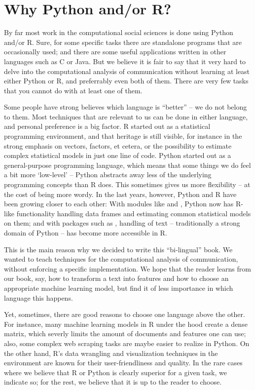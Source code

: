 \section{Why Python and/or R?}
By far most work in the computational social sciences is done using
Python and/or R. Sure, for some specific tasks there are standalone
programs that are occasionally used; and there are some useful applications
written in other languages such as C or Java. But we believe it is
fair to say that it very hard to delve into the computational analysis
of communication without learning at least either Python or R, and
preferrably even both of them.
There are very few tasks that you cannot do with at least one of them.

Some people have strong believes which language is ``better'' -- we do
not belong to them. Most techniques that are relevant to us can be
done in either language, and personal preference is a big factor. R
started out as a statistical programming environment, and that
heritage is still visible, for instance in the strong emphasis on
vectors, factors, et cetera, or the possibility to estimate complex
statistical models in just one line of code. Python started out as a
general-purpose programming language, which means that some things we
do feel a bit more `low-level' -- Python abstracts away less of the
underlying programming concepts than R does. This sometimes gives us
more flexibility -- at the cost of being more wordy.
In the last years, however, Python and R have been
growing closer to each other: With modules like  and
, Python now has R-like functionality handling data
frames and estimating common statistical models on them; and with
packages such as , handling of text -- traditionally a
strong domain of Python -- has become more accessible in R.

This is the main reason why we decided to write this ``bi-lingual''
book. We wanted to teach techniques for the computational analysis of
communication, without enforcing a specific implementation. We hope
that the reader learns from our book, say, how to transform a text
into features and how to choose an appropriate machine learning model,
but find it of less importance in which language this happens.

Yet, sometimes, there are good reasons to choose one language above
the other. For instance, many machine learning models in R under the
hood create a dense matrix, which severly limits the amount of
documents and features one can use; also, some complex web scraping
tasks are maybe easier to realize in Python. On the other hand, R's
data wrangling and visualization techniques in the 
environment are known for their user-friendliness and quality.  In the
rare cases where we believe that R or Python is clearly superior for a
given task, we indicate so; for the rest, we believe that it is up to
the reader to choose.


